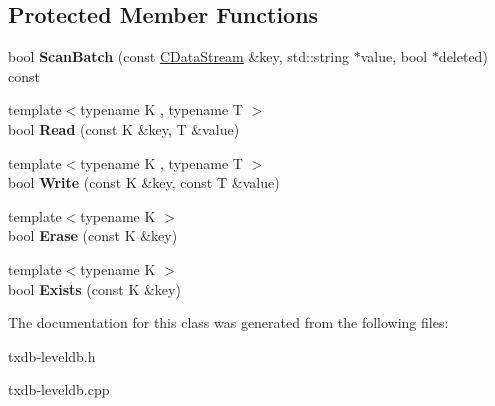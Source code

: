 \subsection*{Protected Member Functions}
\begin{DoxyCompactItemize}
\item 
\mbox{\label{class_c_tx_d_b_a7e9da91da591eb7672ae29bba6899fa0}} 
bool {\bfseries Scan\+Batch} (const \mbox{\hyperlink{class_c_data_stream}{C\+Data\+Stream}} \&key, std\+::string $\ast$value, bool $\ast$deleted) const
\item 
\mbox{\label{class_c_tx_d_b_a9e223a10434f8a73002e84cc75c682de}} 
{\footnotesize template$<$typename K , typename T $>$ }\\bool {\bfseries Read} (const K \&key, T \&value)
\item 
\mbox{\label{class_c_tx_d_b_a58885f67364829a8e0957a5dc810886d}} 
{\footnotesize template$<$typename K , typename T $>$ }\\bool {\bfseries Write} (const K \&key, const T \&value)
\item 
\mbox{\label{class_c_tx_d_b_a57ccf71e92f654e6db68be530d43a837}} 
{\footnotesize template$<$typename K $>$ }\\bool {\bfseries Erase} (const K \&key)
\item 
\mbox{\label{class_c_tx_d_b_a36002f063f6fef483226362a1350e22d}} 
{\footnotesize template$<$typename K $>$ }\\bool {\bfseries Exists} (const K \&key)
\end{DoxyCompactItemize}


The documentation for this class was generated from the following files\+:\begin{DoxyCompactItemize}
\item 
txdb-\/leveldb.\+h\item 
txdb-\/leveldb.\+cpp\end{DoxyCompactItemize}
